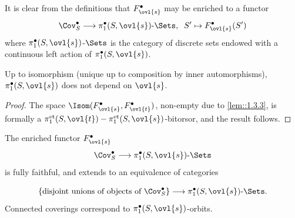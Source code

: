 \begin{para}\label{para::1.4.3} It is clear from the definitions that 
 $F^\bullet_{\ovl{s}}$ may be enriched to a functor
 \begin{equation*}
  \Cov^\bullet_S \longrightarrow
   \text{$\pi_1^\bullet(S,\ovl{s})$-$\Sets$},\;\;S'\mapsto
   F^\bullet_{\ovl{s}}(S')
 \end{equation*}
 where $\pi_1^\bullet(S,\ovl{s})$-$\Sets$ is the category of discrete
 sets endowed with a continuous 
 left action of $\pi_1^\bullet(S,\ovl{s})$. 
\end{para}

\begin{pro}\label{pro::1.4.4} Up to isomorphism (unique up to composition
 by inner automorphisms), $\pi_1^\bullet(S,\ovl{s})$ does not depend on
 $\ovl{s}$.
\end{pro}
\begin{proof}
 The space
 $\Isom(F^\bullet_{\ovl{s}},F^\bullet_{\ovl{t}})$, non-empty due to
 \ref{lem::1.3.3}, is formally a
 $\pi_1^{\mathrm{et}}(S,\ovl{t})-\pi_1^{\mathrm{et}}(S,\ovl{s})$-bitorsor,
 and the result follows.
\end{proof}

\begin{thm}\label{thm::1.4.5} The enriched functor $F^\bullet_{\ovl{s}}$
\begin{equation*}
 \Cov^\bullet_S \longrightarrow \text{$\pi_1^\bullet(S,\ovl{s})$-$\Sets$}
\end{equation*}
is fully faithful, and extends to an equivalence of categories  

\begin{equation*}
\{\text{disjoint unions of objects of }\Cov^\bullet_S\} \longrightarrow
\text{$\pi_1^\bullet(S,\ovl{s})$-$\Sets$}.
\end{equation*}
Connected coverings correspond to $\pi_1^\bullet(S,\ovl{s})$-orbits.
\end{thm}

